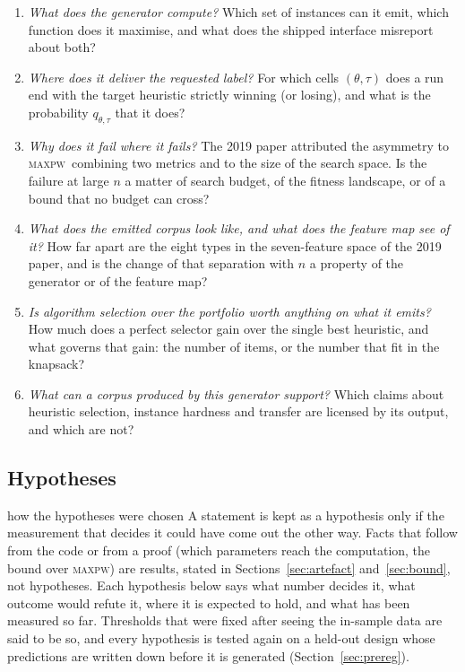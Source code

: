 \documentclass[a4paper,11pt]{article}
\newcommand{\MAXPW}{\textsc{maxpw}}
\theoremstyle{plain}
\theoremstyle{definition}
\theoremstyle{remark}
\begin{document}
\begin{enumerate}[label=\textbf{RQ\arabic*},leftmargin=3em,itemsep=3pt]
\item\label{rq:what} \emph{What does the generator compute?} Which set of instances can it
emit, which function does it maximise, and what does the shipped interface misreport about
both?
\item\label{rq:where} \emph{Where does it deliver the requested label?} For which cells
$(\theta,\tau)$ does a run end with the target heuristic strictly winning (or losing), and
what is the probability $q_{\theta,\tau}$ that it does?
\item\label{rq:why} \emph{Why does it fail where it fails?} The 2019 paper attributed the
asymmetry to \MAXPW\ combining two metrics and to the size of the search space. Is the
failure at large $n$ a matter of search budget, of the fitness landscape, or of a bound that
no budget can cross?
\item\label{rq:geometry} \emph{What does the emitted corpus look like, and what does the
feature map see of it?} How far apart are the eight types in the seven-feature space of the
2019 paper, and is the change of that separation with $n$ a property of the generator or of
the feature map?
\item\label{rq:selection} \emph{Is algorithm selection over the portfolio worth anything on
what it emits?} How much does a perfect selector gain over the single best heuristic, and
what governs that gain: the number of items, or the number that fit in the knapsack?
\item\label{rq:support} \emph{What can a corpus produced by this generator support?} Which
claims about heuristic selection, instance hardness and transfer are licensed by its output,
and which are not?
\end{enumerate}

\subsection{Hypotheses}

\begin{plain}{how the hypotheses were chosen}
A statement is kept as a hypothesis only if the measurement that decides it could have come
out the other way. Facts that follow from the code or from a proof (which parameters reach
the computation, the bound over \MAXPW) are results, stated in
Sections~\ref{sec:artefact} and~\ref{sec:bound}, not hypotheses. Each hypothesis below says
what number decides it, what outcome would refute it, where it is expected to hold, and what
has been measured so far. Thresholds that were fixed after seeing the in-sample data are
said to be so, and every hypothesis is tested again on a held-out design whose predictions
are written down before it is generated (Section~\ref{sec:prereg}).
\end{plain}
\end{document}

